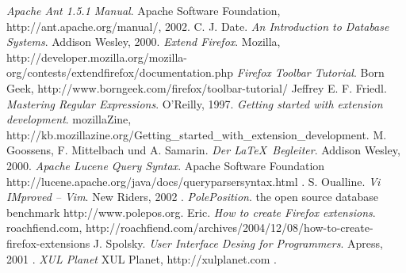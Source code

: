 
\begin{thebibliography}{keine ah}

\bibitem[Apa02]{} \emph{Apache Ant 1.5.1 Manual}. Apache Software Foundation, http://ant.apache.org/manual/, 2002.
\bibitem[Dat00]{} C. J. Date. \emph{An Introduction to Database Systems}. Addison Wesley, 2000.
\bibitem[ExFF]{} \emph{Extend Firefox}. Mozilla, http://developer.mozilla.org/mozilla-org/contests/extendfirefox/documentation.php
\bibitem[FFTT]{} \emph{Firefox Toolbar Tutorial}. Born Geek, http://www.borngeek.com/firefox/toolbar-tutorial/
\bibitem[Fri97]{} Jeffrey E. F. Friedl. \emph{Mastering Regular Expressions}. O'Reilly, 1997.
\bibitem[Gswed]{} \emph{Getting started with extension development}. mozillaZine, http://kb.mozillazine.org/Getting\_started\_with\_extension\_development.
\bibitem[Goo00]{} M. Goossens, F. Mittelbach und A. Samarin. \emph{Der \LaTeX \ Begleiter}. Addison Wesley, 2000.
\bibitem[LucQS]{} \emph{Apache Lucene Query Syntax}. Apache Software Foundation http://lucene.apache.org/java/docs/queryparsersyntax.html .
\bibitem[Oua02]{} S. Oualline. \emph{Vi IMproved -- Vim}. New Riders, 2002 .
\bibitem[PolPos]{} \emph{PolePosition}. the open source database benchmark http://www.polepos.org.
\bibitem[Roac04]{} Eric. \emph{How to create Firefox extensions}. roachfiend.com, http://roachfiend.com/archives/2004/12/08/how-to-create-firefox-extensions
\bibitem[Spo01]{} J. Spolsky. \emph{User Interface Desing for Programmers}. Apress, 2001 .
\bibitem[XULPL]{} \emph{XUL Planet} XUL Planet, http://xulplanet.com .

\end{thebibliography}

